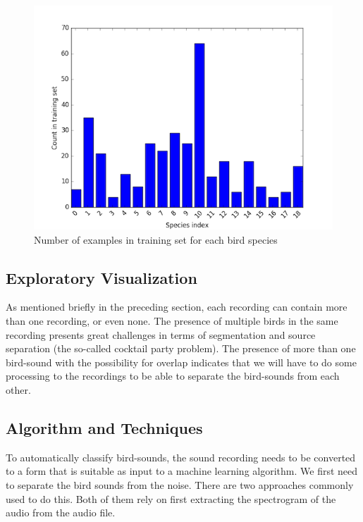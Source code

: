 \documentclass[11pt]{article}
\begin{document}
\begin{figure}[h]
\begin{center}
\includegraphics[width=1.0\textwidth]{../species_count_histogram.png}
\caption{Number of examples in training set for each bird species}
\label{bird_species_count}
\end{center}
\end{figure}

\subsection{Exploratory Visualization}

As mentioned briefly in the preceding section, each recording can contain more than one recording, or even none. The presence of multiple birds in the same recording presents great challenges in terms of segmentation and source separation (the so-called cocktail party problem). The presence of more than one bird-sound with the possibility for overlap indicates that we will have to do some processing to the recordings to be able to separate the bird-sounds from each other.

\subsection{Algorithm and Techniques}

To automatically classify bird-sounds, the sound recording needs to be converted to a form that is suitable as input to a machine learning algorithm. We first need to separate the bird sounds from the noise. There are two approaches commonly used to do this. Both of them rely on first extracting the spectrogram of the audio from the audio file. 
\end{document}
